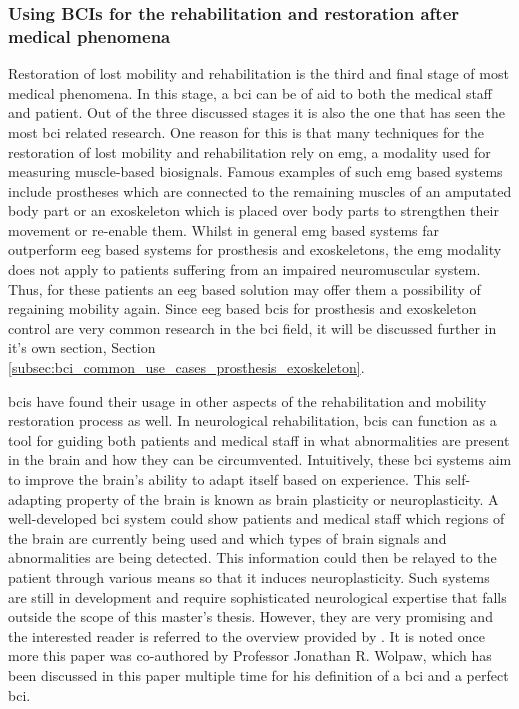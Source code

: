 
\subsubsection{Using BCIs for the rehabilitation and restoration after medical phenomena}
\label{subsubsec:bci_common_use_cases_medical_phenomena_restoration}

Restoration of lost mobility and rehabilitation is the third and final stage of most medical phenomena.
In this stage, a \gls{bci} can be of aid to both the medical staff and patient.
Out of the three discussed stages it is also the one that has seen the most \gls{bci} related research.
One reason for this is that many techniques for the restoration of lost mobility and rehabilitation rely on \gls{emg}, a modality used for measuring muscle-based \glspl{biosignal}.
Famous examples of such \gls{emg} based systems include prostheses which are connected to the remaining muscles of an amputated body part or an exoskeleton which is placed over body parts to strengthen their movement or re-enable them. 
Whilst in general \gls{emg} based systems far outperform \gls{eeg} based systems for prosthesis and exoskeletons, the \gls{emg} modality does not apply to patients suffering from an impaired neuromuscular system.
Thus, for these patients an \gls{eeg} based solution may offer them a possibility of regaining mobility again.
Since \gls{eeg} based \glspl{bci} for prosthesis and exoskeleton control are very common research in the \gls{bci} field, it will be discussed further in it's own section, Section \ref{subsec:bci_common_use_cases_prosthesis_exoskeleton}.

\Glspl{bci} have found their usage in other aspects of the rehabilitation and mobility restoration process as well.
In neurological rehabilitation, \glspl{bci} can function as a tool for guiding both patients and medical staff in what abnormalities are present in the brain and how they can be circumvented.
Intuitively, these \gls{bci} systems aim to improve the brain's ability to adapt itself based on experience.
This self-adapting property of the brain is known as brain plasticity or neuroplasticity.
A well-developed \gls{bci} system could show patients and medical staff which regions of the brain are currently being used and which types of brain signals and abnormalities are being detected.
This information could then be relayed to the patient through various means so that it induces neuroplasticity.
Such systems are still in development and require sophisticated neurological expertise that falls outside the scope of this master's thesis.
However, they are very promising and the interested reader is referred to the overview provided by \citet{bci_rehabilitation}.
It is noted once more this paper was co-authored by Professor Jonathan R. Wolpaw, which has been discussed in this paper multiple time for his definition of a \gls{bci} and a perfect \gls{bci}.


